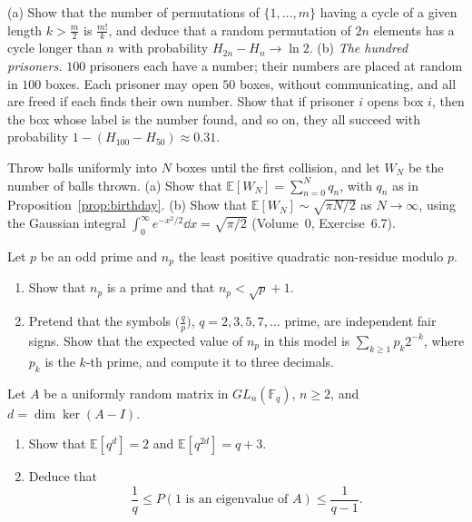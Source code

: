 \begin{exercise}[$\star\star$]\label{ex:prisoners}
(a) Show that the number of permutations of $\{1,\dots,m\}$ having a cycle of a given length $k>\frac m2$ is
$\frac{m!}k$, and deduce that a random permutation of $2n$ elements has a cycle longer than $n$ with probability
$H_{2n}-H_n\to\ln2$. (b) \emph{The hundred prisoners.} $100$ prisoners each have a number; their numbers are placed at random in $100$
boxes. Each prisoner may open $50$ boxes, without communicating, and all are freed if each finds their own number.
Show that if prisoner $i$ opens box $i$, then the box whose label is the number found, and so on, they all succeed
with probability $1-(H_{100}-H_{50})\approx0.31$.
\end{exercise}

\begin{exercise}[$\star\star\star$]\label{ex:birthdaywait}
Throw balls uniformly into $N$ boxes until the first collision, and let $W_N$ be the number of balls thrown. (a)
Show that $\mathbb E[W_N]=\sum_{n=0}^Nq_n$, with $q_n$ as in Proposition~\ref{prop:birthday}. (b) Show that
$\mathbb E[W_N]\sim\sqrt{\pi N/2}$ as $N\to\infty$, using the Gaussian integral $\int_0^\infty e^{-x^2/2}\dd x=\sqrt{\pi/2}$ (Volume~0,
Exercise~6.7).
\end{exercise}

\begin{exercise}[$\star\star$]\label{pb:leastqnr}
Let $p$ be an odd prime and $n_p$ the least positive quadratic non-residue modulo $p$.
\begin{enumerate}[label=(\alph*)]
\item Show that $n_p$ is a prime and that $n_p<\sqrt p+1$.
\item Pretend that the symbols $\bigl(\frac qp\bigr)$, $q=2,3,5,7,\dots$ prime, are independent fair signs. Show that the expected
value of $n_p$ in this model is $\sum_{k\ge1}p_k2^{-k}$, where $p_k$ is the $k$-th prime, and compute it to three decimals.
\end{enumerate}
\end{exercise}

\begin{exercise}[$\star\star$]\label{pb:glfix}
Let $A$ be a uniformly random matrix in $GL_n(\mathbb F_q)$, $n\ge2$, and $d=\dim\ker(A-I)$.
\begin{enumerate}[label=(\alph*)]
\item Show that $\mathbb E[q^d]=2$ and $\mathbb E[q^{2d}]=q+3$.
\item Deduce that
\[
\frac1q\le P(1\text{ is an eigenvalue of }A)\le\frac1{q-1}.
\]
\end{enumerate}
\end{exercise}

